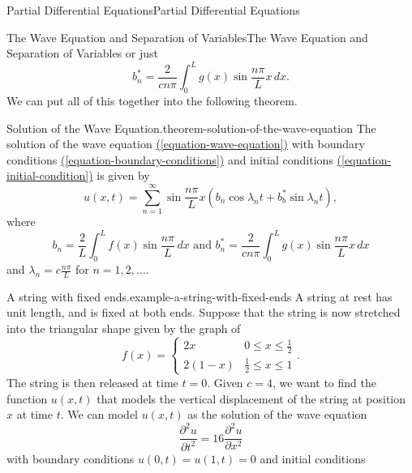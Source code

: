 \documentclass[10pt,]{book}
\numberwithin{equation}{section}
\newcommand{\pdv}[3][]{\dfrac{\partial^{#1} #2}{\partial #3^{#1}}}
\begin{document}
\begin{chapterptx}{Partial Differential Equations}{}{Partial Differential Equations}{}{}
\begin{sectionptx}{The Wave Equation and Separation of Variables}{}{The Wave Equation and Separation of Variables}{}{}
\hypertarget{p-471}{}%
or just%
%
\begin{equation*}
b^{*}_{n} = \frac{2}{cn\pi}\int_{0}^{L}g(x)\sin\frac{n\pi}{L}x\,dx.
\end{equation*}
\hypertarget{p-472}{}%
We can put all of this together into the following theorem.%
\begin{theorem}{Solution of the Wave Equation.}{}{theorem-solution-of-the-wave-equation}%
\hypertarget{p-473}{}%
The solution of the wave equation \hyperref[equation-wave-equation]{(\ref{equation-wave-equation})} with boundary conditions \hyperref[equation-boundary-conditions]{(\ref{equation-boundary-conditions})} and initial conditions \hyperref[equation-initial-condition]{(\ref{equation-initial-condition})} is given by%
%
\begin{equation*}
u(x,t) = \sum_{n=1}^{\infty}\sin\frac{n\pi}{L}x(b_{n}\cos\lambda_{n}t+b^{*}_{b}\sin\lambda_{n}t),
\end{equation*}
\hypertarget{p-474}{}%
where%
%
\begin{equation*}
b_{n} = \frac{2}{L}\int_{0}^{L}f(x)\sin\frac{n\pi}{L}\,dx\text{ and }b^{*}_{n} = \frac{2}{cn\pi}\int_{0}^{L}g(x)\sin\frac{n\pi}{L}x\,dx
\end{equation*}
\hypertarget{p-475}{}%
and \(\lambda_{n} = c\frac{n\pi}{L}\) for \(n=1,2,\ldots\).%
\end{theorem}
\begin{example}{A string with fixed ends.}{example-a-string-with-fixed-ends}%
\hypertarget{p-476}{}%
A string at rest has unit length, and is fixed at both ends. Suppose that the string is now stretched into the triangular shape given by the graph of%
%
\begin{equation*}
f(x) = \begin{cases} 2x & 0\leq x\leq \frac{1}{2} \\ 2(1-x) & \frac{1}{2}\leq x\leq 1 \end{cases}.
\end{equation*}
\hypertarget{p-477}{}%
The string is then released at time \(t=0\). Given \(c=4\), we want to find the function \(u(x,t)\) that models the vertical displacement of the string at position \(x\) at time \(t\). We can model \(u(x,t)\) as the solution of the wave equation%
%
\begin{equation*}
\pdv[2]{u}{t} = 16\pdv[2]{u}{x}
\end{equation*}
\hypertarget{p-478}{}%
with boundary conditions \(u(0,t) = u(1,t) = 0\) and initial conditions%
%
\begin{equation*}

\end{equation*}
\end{example}
\end{sectionptx}
\end{chapterptx}
\end{document}
